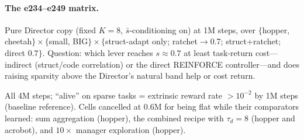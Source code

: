 \documentclass[10pt]{article}
\begin{document}
\paragraph{The e234--e249 matrix.} Pure Director copy (fixed $K{=}8$,
$\bar s$-conditioning on) at 1M steps, over $\{$hopper, cheetah$\}\times\{$small,
BIG$\}\times\{$struct-adapt only; ratchet$\to$0.7; struct+ratchet; direct
$0.7\}$. Question: which lever reaches $s\approx0.7$ at least task-return
cost---indirect (struct/code correlation) or the direct REINFORCE controller---and
does raising sparsity above the Director's natural band help or cost return.

All 4M steps; ``alive'' on sparse tasks = extrinsic reward rate $>10^{-2}$ by
1M steps (baseline reference). Cells cancelled at 0.6M for being flat while
their comparators learned: sum aggregation (hopper), the combined recipe with
$\tau_d{=}8$ (hopper and acrobot), and $10\times$ manager exploration (hopper).
\end{document}

